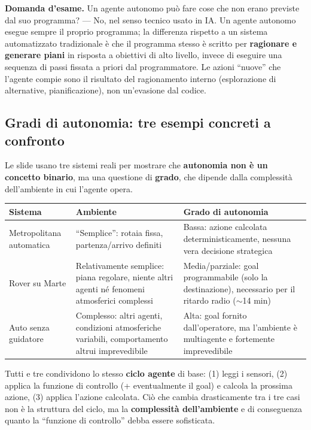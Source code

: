 \documentclass[11pt,a4paper]{report}
\newcommand{\domandaesame}[1]{\begin{esame}\textbf{Domanda d'esame.} #1\end{esame}}
\begin{document}
\domandaesame{Un agente autonomo può fare cose che non erano previste dal suo programma? --- No, nel senso tecnico usato in IA. Un agente autonomo esegue sempre il proprio programma; la differenza rispetto a un sistema automatizzato tradizionale è che il programma stesso è scritto per \textbf{ragionare e generare piani} in risposta a obiettivi di alto livello, invece di eseguire una sequenza di passi fissata a priori dal programmatore. Le azioni ``nuove'' che l'agente compie sono il risultato del ragionamento interno (esplorazione di alternative, pianificazione), non un'evasione dal codice.}

\subsection{Gradi di autonomia: tre esempi concreti a confronto}

Le slide usano tre sistemi reali per mostrare che \textbf{autonomia non è un concetto binario}, ma una questione di \textbf{grado}, che dipende dalla complessità dell'ambiente in cui l'agente opera.

\begin{center}
\small
\begin{tabular}{@{}p{2.4cm}p{4.3cm}p{4.3cm}@{}}
\toprule
\textbf{Sistema} & \textbf{Ambiente} & \textbf{Grado di autonomia} \\
\midrule
Metropolitana automatica & ``Semplice'': rotaia fissa, partenza/arrivo definiti & Bassa: azione calcolata deterministicamente, nessuna vera decisione strategica \\
Rover su Marte & Relativamente semplice: piana regolare, niente altri agenti né fenomeni atmosferici complessi & Media/parziale: goal programmabile (solo la destinazione), necessario per il ritardo radio ($\sim$14 min) \\
Auto senza guidatore & Complesso: altri agenti, condizioni atmosferiche variabili, comportamento altrui imprevedibile & Alta: goal fornito dall'operatore, ma l'ambiente è multiagente e fortemente imprevedibile \\
\bottomrule
\end{tabular}
\normalsize
\end{center}

Tutti e tre condividono lo stesso \textbf{ciclo agente} di base: (1) leggi i sensori, (2) applica la funzione di controllo (+ eventualmente il goal) e calcola la prossima azione, (3) applica l'azione calcolata. Ciò che cambia drasticamente tra i tre casi non è la struttura del ciclo, ma la \textbf{complessità dell'ambiente} e di conseguenza quanto la ``funzione di controllo'' debba essere sofisticata.
\end{document}
